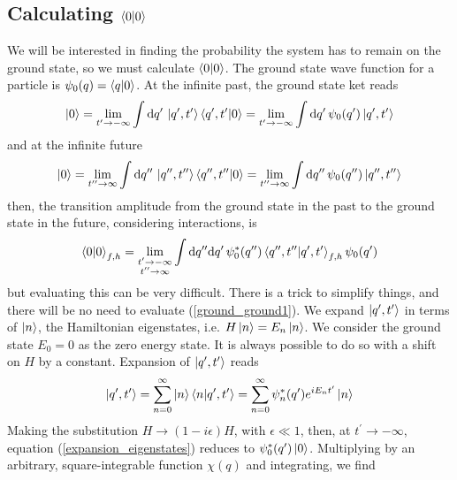 \subsection{Calculating $\braket{0}{0}$}
We will be interested in finding the probability the system has to remain on the ground state, so  we must calculate $\braket{0}$.
The ground state wave function for a particle is  $\psi_0(q)=\braket{q}{0}$. At the infinite past, the ground state ket reads
\begin{equation}
    \ket{0}=\lim_{t^\prime\to-\infty}\int\dd q^\prime\, \ket{q^\prime,t^\prime}\braket{q^\prime,t^\prime}{0}=\lim_{t^\prime\to-\infty}\int\dd q^\prime\,\psi_0(q^\prime)\ket{q^\prime,t^{\prime}}
\end{equation}
and at the infinite future
\begin{equation}
    \ket{0}=\lim_{t^{\prime\prime}\to\infty}\int\dd q^{\prime\prime}\, \ket{q^{\prime\prime},t^{\prime\prime}}\braket{q^{\prime\prime},t^{\prime\prime}}{0}=\lim_{t^{\prime\prime}\to\infty}\int\dd q^{\prime\prime}\,\psi_0(q^{\prime\prime}) \ket{q^{\prime\prime},t^{\prime\prime}}
\end{equation}
then, the transition amplitude from the ground state in the past to the ground state in the future, considering interactions, is
\begin{equation}
    \braket{0}_{f,h}=\lim_{\substack{t^{\prime}\to-\infty\\t^{\prime\prime}\to\infty}}\int \dd q^{\prime\prime}\dd q^\prime\,\psi_0^*(q^{\prime\prime})\braket{q^{\prime\prime},t^{\prime\prime}}{q^{\prime},t^\prime}_{f,h}\psi_0(q^\prime)
    \label{ground_ground1}
\end{equation}
but evaluating this can be very difficult. There is a trick to simplify things, and there will be no need to evaluate (\ref{ground_ground1}). We expand $\ket{q^\prime,t^\prime}$ in terms of $\ket{n}$, the Hamiltonian eigenstates, i.e. $H\ket{n}=E_n\ket{n}$. We consider the ground state $E_0=0$ 
 as the zero energy state. It is always possible to do so with a shift on $H$ by a constant. Expansion of $\ket{q^\prime,t^\prime}$ reads
\begin{equation}
    \ket{q^{\prime},t^{\prime}}=\sum_{n=0}^\infty\ket{n}\bra{n}\ket{q^{\prime},t^{\prime}}=\sum_{n=0}^\infty\psi_n^*(q^\prime)e^{iE_nt^\prime}\ket{n}
    \label{expansion_eigenstates}
\end{equation}
Making the substitution $H\to(1-i\epsilon)H$, with $\epsilon\ll1$, then, at $t^\prime\to-\infty$, equation (\ref{expansion_eigenstates}) reduces to $\psi_0^*(q^\prime)\ket{0}$. Multiplying by an arbitrary, square-integrable function $\chi(q)$ and integrating, we find
